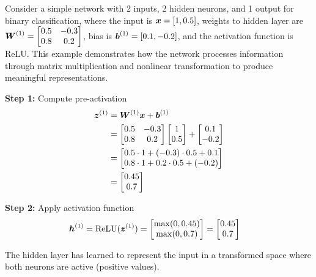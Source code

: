 \begin{example}
\label{ex:forward-pass}

Consider a simple network with 2 inputs, 2 hidden neurons, and 1 output for binary classification, where the input is $\boldsymbol{x} = [1, 0.5]$, weights to hidden layer are $\boldsymbol{W}^{(1)} = \begin{bmatrix} 0.5 & -0.3 \\ 0.8 & 0.2 \end{bmatrix}$, bias is $\boldsymbol{b}^{(1)} = [0.1, -0.2]$, and the activation function is ReLU. This example demonstrates how the network processes information through matrix multiplication and nonlinear transformation to produce meaningful representations.

\textbf{Step 1:} Compute pre-activation
\begin{align}
\boldsymbol{z}^{(1)} &= \boldsymbol{W}^{(1)} \boldsymbol{x} + \boldsymbol{b}^{(1)} \\
&= \begin{bmatrix} 0.5 & -0.3 \\ 0.8 & 0.2 \end{bmatrix} \begin{bmatrix} 1 \\ 0.5 \end{bmatrix} + \begin{bmatrix} 0.1 \\ -0.2 \end{bmatrix} \\
&= \begin{bmatrix} 0.5 \cdot 1 + (-0.3) \cdot 0.5 + 0.1 \\ 0.8 \cdot 1 + 0.2 \cdot 0.5 + (-0.2) \end{bmatrix} \\
&= \begin{bmatrix} 0.45 \\ 0.7 \end{bmatrix}
\end{align}

\textbf{Step 2:} Apply activation function
\begin{align}
\boldsymbol{h}^{(1)} &= \text{ReLU}(\boldsymbol{z}^{(1)}) = \begin{bmatrix} \max(0, 0.45) \\ \max(0, 0.7) \end{bmatrix} = \begin{bmatrix} 0.45 \\ 0.7 \end{bmatrix}
\end{align}

The hidden layer has learned to represent the input in a transformed space where both neurons are active (positive values).
\end{example}

